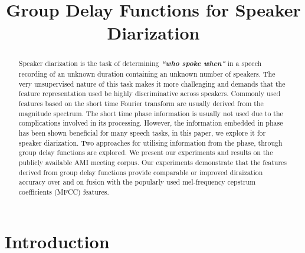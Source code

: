 \documentclass[conference]{IEEEtran}
\begin{document}
\title{Group Delay Functions for Speaker Diarization}

\author{
}

\maketitle


\begin{abstract}

Speaker diarization is the task of determining {\bf\textit{``who spoke when"}}
in a speech recording of an unknown duration containing an unknown number of
speakers. The very unsupervised nature of this task makes it more challenging
and demands that the feature representation used be  highly discriminative across 
speakers.
Commonly used features based on the short time Fourier transform are usually
derived from the magnitude spectrum. The short time phase information is usually
not used due to the complications involved in its processing. However, the information
embedded in phase has been shown beneficial for many speech tasks, in this
paper, we explore it for speaker diarization. Two approaches for utilising
information from the phase, through group delay functions are explored.
We present our experiments and results on the 
publicly available AMI meeting corpus. Our experiments demonstrate that the features
derived from group delay functions provide comparable or improved diraization
accuracy over and on fusion with the popularly used mel-frequency cepstrum
coefficients (MFCC) features. \\

\end{abstract}
\IEEEpeerreviewmaketitle



\section{Introduction}
\label{intro}
\end{document}
